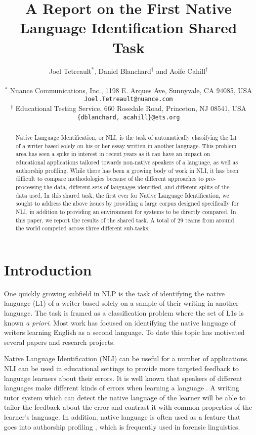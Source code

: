 \documentclass[11pt,letterpaper]{article}
\title{A Report on the First Native Language Identification Shared Task}
\author{Joel Tetreault$^{*}$, Daniel Blanchard$^{\dag}$ and Aoife Cahill$^{\dag}$\\
\\
  { $^{*}$ Nuance Communications, Inc., 1198 E. Arques Ave, Sunnyvale, CA 94085, USA}\\
  { {\tt Joel.Tetreault@nuance.com}} \\
  { $^{\dag}$ Educational Testing Service, 660 Rosedale Road, Princeton, NJ 08541, USA}\\
  { {\tt \{dblanchard, acahill\}@ets.org}}\\
}
\date{}
\begin{document}
\maketitle
\begin{abstract}
Native Language Identification, or NLI, is the task of automatically classifying
the L1 of a writer based solely on his or her essay written in another language.  This problem area has
seen a spike in interest in recent years as it can have an impact on
educational applications tailored towards non-native speakers of a language,
as well as authorship profiling.
While there has been a growing body of work in NLI, it has been difficult to compare
methodologies because of the different approaches to pre-processing the data, different
sets of languages identified, and different splits of the data used.
In this shared task, the first
ever for Native Language Identification, we sought to
address the above issues by providing a large corpus designed specifically for NLI,
in addition to providing an environment for systems to be directly compared.
In this paper, we report the results of the shared task.
A total of 29 teams from around the world competed across
three different sub-tasks.
\end{abstract}

\section{Introduction}
\label{sec-intro}
One quickly growing subfield in NLP is the task of identifying the native
language (L1) of a writer based solely on a sample of their writing in another language. The task
is framed as a classification problem where the set of L1s is known \emph{a priori}.
Most work has focused on identifying the native language of writers
learning English as a second language. To date this topic has motivated
several papers and research projects.

Native Language Identification (NLI) can be useful for a number of
applications. NLI can be used in educational settings to provide more
targeted feedback to language learners about their errors. It is
well known that speakers of different languages make different kinds of
errors when learning a language \cite{SwanSmith01}. A writing tutor system
which can detect the native language of the learner will be able to tailor
the feedback about the error and contrast it with common
properties of the learner's language. In addition, native language is
often used as a feature that goes into authorship profiling
\cite{estival2007author}, which is frequently used in forensic linguistics.
\end{document}
